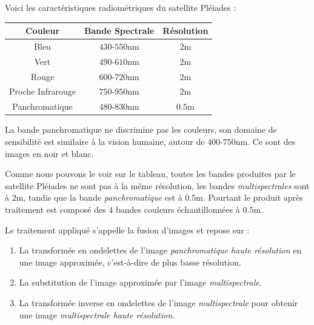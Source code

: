 \documentclass[a4paper, 11pt]{report}
\begin{document}
Voici les caractéristiques radiométriques du satellite Pléiades :
\begin{center}
	\begin{tabular}{|c|c|c|}
	\hline
	Couleur & Bande Spectrale & Résolution \\
	\hline 
	Bleu & $430$-$550$nm & $2$m \\ 
	\hline 
	Vert & $490$-$610$nm & $2$m \\ 
	\hline 
	Rouge & $600$-$720$nm & $2$m \\ 
	\hline 
	Proche Infrarouge & $750$-$950$nm & $2$m \\ 
	\hline 
	Panchromatique & $480$-$830$nm & $0.5$m \\ 
	\hline 
	\end{tabular}
\end{center}
La bande panchromatique ne discrimine pas les couleurs, son domaine de sensibilité est similaire à la vision humaine, autour de $400$-$750$nm. Ce sont des images en noir et blanc.

Comme nous pouvons le voir sur le tableau, toutes les bandes produites par le satellite Pléiades ne sont pas à la même résolution, les bandes \emph{multispectrales} sont à $2$m, tandis que la bande \emph{panchromatique} est à $0.5$m.
Pourtant le produit après traitement est composé des $4$ bandes couleurs échantillonnées à $0.5$m.

Le traitement appliqué s'appelle la fusion d'images et repose sur :
\begin{enumerate}
	\item La transformée en ondelettes de l'image \emph{panchromatique haute résolution} en une image approximée, c'est-à-dire de plus basse résolution.
	\item La substitution de l'image approximée par l'image \emph{multispectrale}.
	\item La transformée inverse en ondelettes de l'image \emph{multispectrale} pour obtenir une image \emph{multispectrale haute résolution}.
\end{enumerate}
\end{document}
